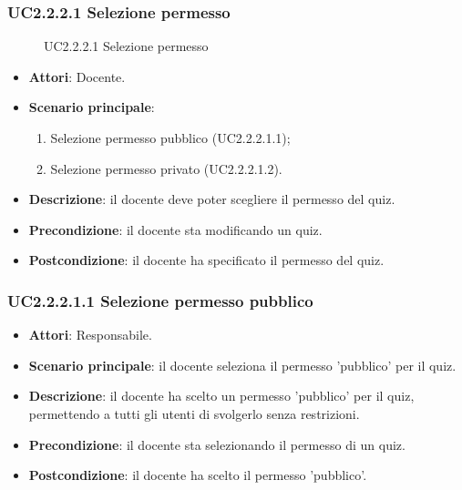 \subsubsection{UC2.2.2.1 Selezione permesso}
\begin{figure}[H]
\centering
\noindent{}
\caption{UC2.2.2.1 Selezione permesso}
\end{figure}
\begin{itemize}
\item \textbf{Attori}: Docente.
\item \textbf{Scenario principale}:
\begin{enumerate}
\item Selezione permesso pubblico (UC2.2.2.1.1);
\item Selezione permesso privato (UC2.2.2.1.2).
\end{enumerate}
\item \textbf{Descrizione}: il docente deve poter scegliere il permesso del quiz.
\item \textbf{Precondizione}: il docente sta modificando un quiz.
\item \textbf{Postcondizione}: il docente ha specificato il permesso del quiz.
\end{itemize}
\subsubsection{UC2.2.2.1.1 Selezione permesso pubblico}
\begin{itemize}
\item \textbf{Attori}: Responsabile.
\item \textbf{Scenario principale}: il docente seleziona il permesso 'pubblico' per il quiz.
\item \textbf{Descrizione}: il docente ha scelto un permesso 'pubblico' per il quiz, permettendo a tutti gli utenti di svolgerlo senza restrizioni.
\item \textbf{Precondizione}: il docente sta selezionando il permesso di un quiz.
\item \textbf{Postcondizione}: il docente ha scelto il permesso 'pubblico'.
\end{itemize}
